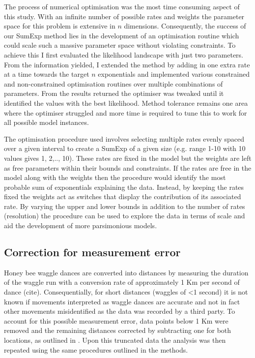 \documentclass[11pt,usenames,dvipsnames,a4paper]{article}
\begin{document}
\begin{linenumbers}
The process of numerical optimisation was the most time consuming aspect of this study. With an infinite number of possible rates and weights the parameter space for this problem is extensive in $n$ dimensions. Consequently, the success of our SumExp method lies in the development of an optimisation routine which could scale such a massive parameter space without violating constraints. To achieve this I first evaluated the likelihood landscape with just two parameters. From the information yielded, I extended the method by adding in one extra rate at a time towards the target $n$ exponentials and implemented various constrained and non-constrained optimisation routines over multiple combinations of parameters. From the results returned the optimiser was tweaked until it identified the values with the best likelihood. Method tolerance remains one area where the optimiser struggled and more time is required to tune this to work for all possible model instances.

The optimisation procedure used involves selecting multiple rates evenly spaced over a given interval to create a SumExp of a given size (e.g. range 1-10 with 10 values gives 1, 2,.., 10). These rates are fixed in the model but the weights are left as free parameters within their bounds and constraints. If the rates are free in the model along with the weights then the procedure would identify the most probable sum of exponentials explaining the data. Instead, by keeping the rates fixed the weights act as switches that display the contribution of its associated rate. By varying the upper and lower bounds in addition to the number of rates (resolution) the procedure can be used to explore the data in terms of scale and aid the development of more parsimonious models. 
\end{linenumbers}

\subsection{Correction for measurement error}

\begin{linenumbers}
\hspace{\parindent}
Honey bee waggle dances are converted into distances by measuring the duration of the waggle run with a conversion rate of approximately 1 Km per second of dance (cite). Consequentially, for short distances (waggles of \textless 1 second) it is not known if movements interpreted as waggle dances are accurate and not in fact other movements misidentified as the data was recorded by a third party. To account for this possible measurement error, data points below 1 Km were removed and the remaining distances corrected by subtracting one for both locations, as outlined in \cite{Petrovskii2011}. Upon this truncated data the analysis was then repeated using the same procedures outlined in the methods.
\end{linenumbers}
\end{document}
